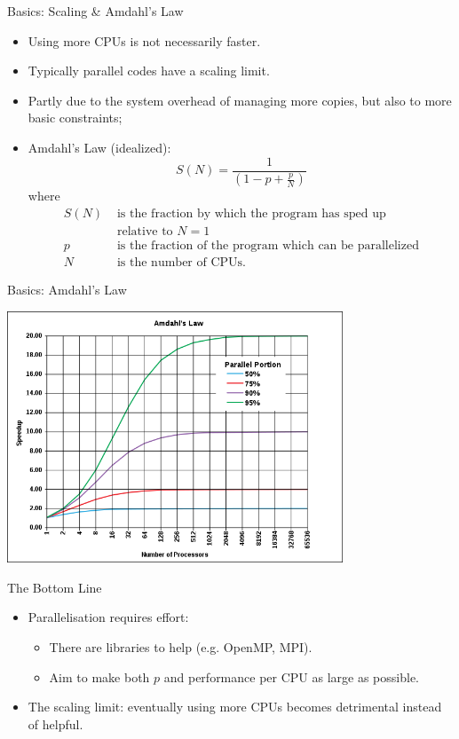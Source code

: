 \begin{frame}{Basics: Scaling \& Amdahl's Law}
\begin{itemize}
\item{\alert{Using more CPUs is not necessarily faster.}}
  \pause
\item{Typically parallel codes have a \alert{scaling limit}.}
\item{Partly due to the system overhead of managing more copies, but also to more basic constraints;}
\pause
\item{Amdahl's Law (idealized):}
\[
S(N)=\frac{1}{\left(1-p+\frac{p}{N}\right)}
\]
where \begin{align*}S(N)&\text{ is the fraction by which the program has sped up}\\&\text{ relative to $N=1$}\\
p&\text{ is the fraction of the program which can be parallelized}\\
N&\text{ is the number of CPUs.}
\end{align*}
\end{itemize}
\end{frame}

\begin{frame}{Basics: Amdahl's Law}
\centerline{\includegraphics[width=0.75\textwidth]{imgs/AmdahlsLaw.png}}%
\smallskip
\end{frame}

\begin{frame}{The Bottom Line}
\begin{itemize}
\item{Parallelisation requires effort:}
\begin{itemize}
\item{There are libraries to help (e.g. \alert{OpenMP}, \alert{MPI}).}
\item{Aim to make both $p$ and performance per CPU as large as possible.}
\end{itemize}
\pause
\item{The scaling limit: eventually using more CPUs becomes \alert{detrimental} instead of helpful.}
\end{itemize}
\end{frame}

